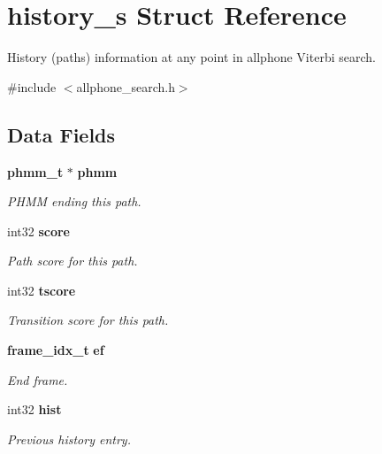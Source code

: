 \section{history\+\_\+s Struct Reference}
\label{structhistory__s}


History (paths) information at any point in allphone Viterbi search.  




{\ttfamily \#include $<$allphone\+\_\+search.\+h$>$}

\subsection*{Data Fields}
\begin{DoxyCompactItemize}
\item 
{\bf phmm\+\_\+t} $\ast$ {\bf phmm}\label{structhistory__s_a548a5d7505c78278114ab9b1d5e0ceaa}

\begin{DoxyCompactList}\small\item\em P\+H\+M\+M ending this path. \end{DoxyCompactList}\item 
int32 {\bf score}\label{structhistory__s_af24720abad5e2e17a99c5aeffa7dc95e}

\begin{DoxyCompactList}\small\item\em Path score for this path. \end{DoxyCompactList}\item 
int32 {\bf tscore}\label{structhistory__s_a09096eb94eba8ad29dc19f231192a24b}

\begin{DoxyCompactList}\small\item\em Transition score for this path. \end{DoxyCompactList}\item 
{\bf frame\+\_\+idx\+\_\+t} {\bf ef}\label{structhistory__s_a59e1a1053ba224c4d015f08192c7fd96}

\begin{DoxyCompactList}\small\item\em End frame. \end{DoxyCompactList}\item 
int32 {\bf hist}\label{structhistory__s_a0e9457246e140d8af571eea044178551}

\begin{DoxyCompactList}\small\item\em Previous history entry. \end{DoxyCompactList}\end{DoxyCompactItemize}


